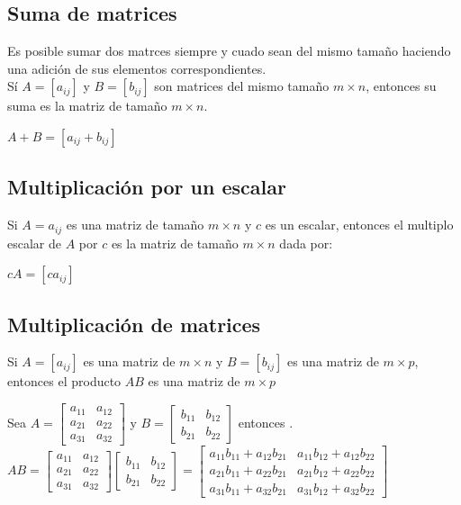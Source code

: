 \subsection{Suma de matrices}
Es posible sumar dos matrces siempre y cuado sean del mismo tamaño haciendo una adici\'on de sus elementos correspondientes.\\
S\'i $A=[a_{ij}]$ y $B=[b_{ij}]$ son matrices del mismo tamaño $m \times n$, entonces su suma es la matriz de tamaño $m \times n$. \\
\begin{center}
$A+B=[a_{ij}+b_{ij}]$
\end{center}
\subsection{Multiplicaci\'on por un escalar}
Si $A=a_{ij}$ es una matriz de tamaño $m \times n$ y $c$ es un escalar, entonces el multiplo escalar de $A$ por $c$ es la matriz de tamaño $m \times n$ dada por:
\begin{center}
$cA=[ca_{ij}]$
\end{center}  
\subsection{Multiplicaci\'on de matrices}
Si $A=[a_{ij}]$ es una matriz de $m \times n$ y $B=[b_{ij}]$ es una matriz de $m \times p$, entonces el producto $AB$ es una matriz de $m \times p$
\begin{center}
Sea $A=\begin{bmatrix}
a_{11} & a_{12}\\
a_{21} & a_{22}\\
a_{31} & a_{32}
\end{bmatrix}$ y $B=\begin{bmatrix}
b_{11} & b_{12}\\
b_{21} & b_{22}
\end{bmatrix}$ entonces \bigskip \bigskip .
$AB=\begin{bmatrix}
a_{11} & a_{12}\\
a_{21} & a_{22}\\
a_{31} & a_{32}
\end{bmatrix}
\begin{bmatrix}
b_{11} & b_{12}\\
b_{21} & b_{22}
\end{bmatrix}=
\begin{bmatrix}
a_{11}b_{11}+a_{12}b_{21} & a_{11}b_{12}+a_{12}b_{22}\\
a_{21}b_{11}+a_{22}b_{21} & a_{21}b_{12}+a_{22}b_{22}\\
a_{31}b_{11}+a_{32}b_{21} & a_{31}b_{12}+a_{32}b_{22}
\end{bmatrix}$
\end{center}
